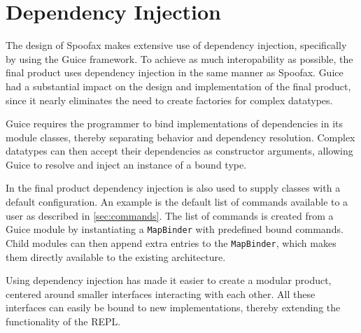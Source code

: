 \section{Dependency Injection}
\label{sec:injection}

The design of Spoofax makes extensive use of dependency injection, specifically
by using the Guice framework.  To achieve as much interopability as possible, the final product
uses dependency injection in the same manner as Spoofax. Guice had a
substantial impact on the design and implementation of the final product, since
it nearly eliminates the need to create factories for complex datatypes.

Guice requires the programmer to bind implementations of dependencies in its
module classes, thereby separating behavior and dependency resolution.  Complex
datatypes can then accept their dependencies as constructor arguments, allowing
Guice to resolve and inject an instance of a bound type.

In the final product dependency injection is also used to supply classes
with a default configuration.  An example is the default list of commands
available to a user as described in \cref{sec:commands}.  The list of commands
is created from a Guice module by instantiating a \texttt{MapBinder} with
predefined bound commands. Child modules can then append extra entries to the
\texttt{MapBinder}, which makes them directly available to the existing
architecture.

Using dependency injection has made it easier to create a modular product,
centered around smaller interfaces interacting with each other. All these
interfaces can easily be bound to new implementations, thereby extending the
functionality of the REPL.
